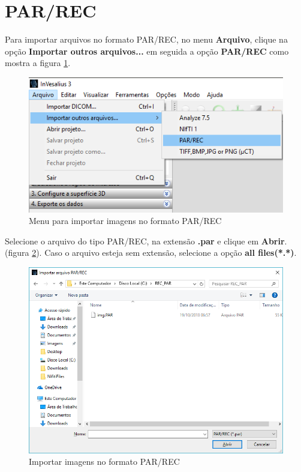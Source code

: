 \section{PAR/REC}


Para importar arquivos no formato PAR/REC, no menu \textbf{Arquivo}, clique na opção \textbf{Importar outros arquivos...} em seguida a opção \textbf{PAR/REC} como mostra a figura \ref{fig:import_parrec_menu_pt}.

\begin{figure}[!htb]
\centering
\includegraphics[scale=0.4]{../user_guide_figures/invesalius_screen/import_parrec_menu_pt.png}
\caption{Menu para importar imagens no formato PAR/REC}
\label{fig:import_parrec_menu_pt}
\end{figure}

Selecione o arquivo do tipo PAR/REC, na extensão \textbf{.par} e clique em \textbf{Abrir}. (figura \ref{fig:import_parrec_window_pt}). Caso o arquivo esteja sem extensão, selecione a opção \textbf{all files(*.*)}.

\begin{figure}[!htb]
\centering
\includegraphics[scale=0.4]{../user_guide_figures/invesalius_screen/import_parrec_window_pt.png}
\caption{Importar imagens no formato PAR/REC}
\label{fig:import_parrec_window_pt}
\end{figure}



